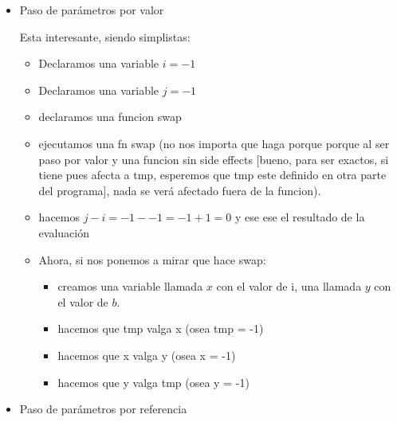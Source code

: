 \documentclass[journal,12pt,onecolumn]{IEEEtran}                %
\theoremstyle{break}                                            %
\begin{document}
    \begin{itemize}
      \item Paso de parámetros por valor
      
        Esta interesante, siendo simplistas:
        \begin{itemize}
          \item Declaramos una variable $i = -1$
          \item Declaramos una variable $j = -1$
          \item declaramos una funcion swap
          \item ejecutamos una fn swap (no nos importa que haga porque porque al ser paso 
          por valor y una funcion sin side effects [bueno, para ser exactos, si tiene pues 
          afecta a tmp, esperemos que tmp este definido en otra parte del programa], 
          nada se verá afectado fuera de la funcion).
          \item hacemos $j - i = -1 - -1 = -1 + 1 = 0$ y ese ese el resultado de la evaluación
          \item
          Ahora, si nos ponemos a mirar que hace swap:
          \begin{itemize}
            \item creamos una variable llamada $x$ con el valor de i, una llamada $y$ 
            con el valor de $b$.
            \item hacemos que tmp valga x (osea tmp = -1)
            \item hacemos que x valga y (osea x = -1)
            \item hacemos que y valga tmp (osea y = -1)
          \end{itemize}
        \end{itemize}

      \item Paso de parámetros por referencia
      

\end{itemize}
\end{document}
